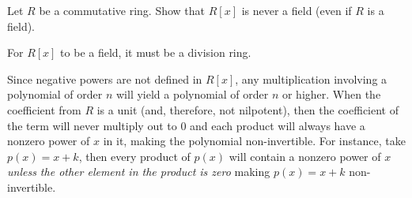 \begin{problem}
  \begin{enumalph}
    \item Let $R$ be a commutative ring.
      Show that $R[x]$ is never a field (even if $R$ is a field).
      \begin{Answer}
        For $R[x]$ to be a field, it must be a division ring.
        
        \begin{enumalph}
          
        \item Since negative powers are not defined in $R[x]$,
          any multiplication involving a polynomial of order $n$
          will yield a polynomial of order $n$ or higher.
          When the coefficient from $R$ is a unit (and, therefore, not nilpotent),
          then the coefficient of the term will never multiply out to $0$ and each product will
          always have a nonzero power of $x$ in it, making the polynomial non-invertible.
          For instance, take $p(x) = x + k$, then every product of $p(x)$ will contain a
          nonzero power of $x$ \emph{unless the other element in the product is zero}
          making $p(x) = x+k$ non-invertible.


\end{enumalph}
\end{Answer}
\end{enumalph}
\end{problem}

